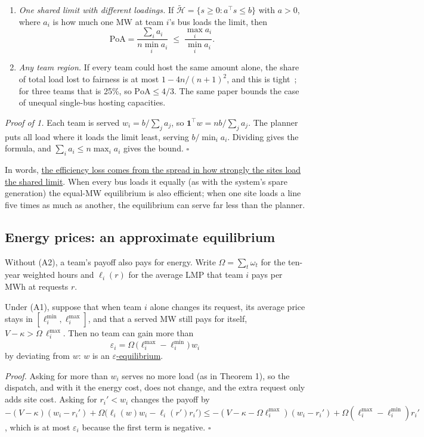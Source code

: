 \documentclass[10pt]{article}
\newcommand{\alert}[1]{{\color{alertblue}\uline{#1}}}
\begin{document}
\begin{keybox}
\begin{enumerate}[leftmargin=*]
  \item \emph{One shared limit with different loadings.} If
    $\widetilde{\mathcal H} = \{ s \ge 0 : a^{\top} s \le b \}$ with $a > 0$,
    where $a_i$ is how much one MW at team $i$'s bus loads the limit, then
    \[
      \mathrm{PoA} = \frac{\sum_i a_i}{n \min_i a_i} \;\le\; \frac{\max_i a_i}{\min_i a_i}.
    \]
  \item \emph{Any team region.} If every team could host the same amount
    alone, the share of total load lost to fairness is at most
    $1 - 4n/(n+1)^2$, and this is tight~\cite{bertsimas2011price}; for three
    teams that is 25\%, so $\mathrm{PoA} \le 4/3$. The same paper bounds the
    case of unequal single-bus hosting capacities.
\end{enumerate}
\end{keybox}
\emph{Proof of 1.} Each team is served $w_i = b / \sum_j a_j$, so
$\mathbf 1^{\top} w = n b/\sum_j a_j$. The planner puts all load where it
loads the limit least, serving $b/\min_i a_i$. Dividing gives the formula, and
$\sum_i a_i \le n \max_i a_i$ gives the bound. $\square$

In words, \alert{the efficiency loss comes from the spread in how strongly the
sites load the shared limit}. When every bus loads it equally (as with the
system's spare generation) the equal-MW equilibrium is also efficient; when
one site loads a line five times as much as another, the equilibrium can serve
far less than the planner.

\subsection{Energy prices: an approximate equilibrium}

Without (A2), a team's payoff also pays for energy. Write $\Omega =
\sum_t \omega_t$ for the ten-year weighted hours and $\ell_i(r)$ for the
average LMP that team $i$ pays per MWh at requests $r$.

\begin{keybox}
Under (A1), suppose that when team $i$ alone changes its request, its average
price stays in $[\ell_i^{\min}, \ell_i^{\max}]$, and that a served MW still pays
for itself, $V - \kappa > \Omega\,\ell_i^{\max}$. Then no team can gain more
than
\[
  \varepsilon_i = \Omega\,\big(\ell_i^{\max} - \ell_i^{\min}\big)\, w_i
\]
by deviating from $w$: $w$ is an \alert{$\varepsilon$-equilibrium}.
\end{keybox}
\emph{Proof.} Asking for more than $w_i$ serves no more load (as in
Theorem 1), so the dispatch, and with it the energy cost, does not change, and
the extra request only adds site cost. Asking for $r_i' < w_i$ changes the
payoff by
$-(V-\kappa)(w_i - r_i') + \Omega\big(\ell_i(w) w_i - \ell_i(r') r_i'\big)
\le -(V - \kappa - \Omega\ell_i^{\max})(w_i - r_i') + \Omega(\ell_i^{\max} - \ell_i^{\min}) r_i'$,
which is at most $\varepsilon_i$ because the first term is negative. $\square$
\end{document}
